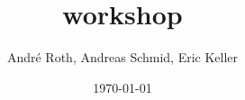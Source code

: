 \documentclass[t,8pt]{beamer}
\begin{document}
\title{workshop}
\author{André Roth, Andreas Schmid, Eric Keller}

\date{\today}


\frame{\titlepage}


\end{document}
